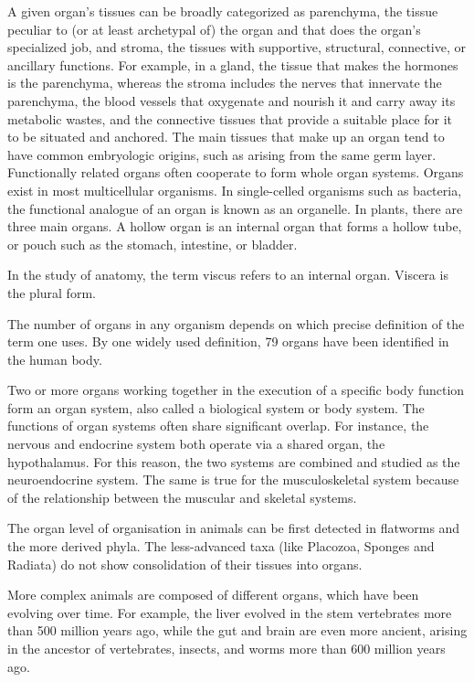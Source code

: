A given organ's tissues can be broadly categorized as parenchyma, the tissue peculiar to (or at least archetypal of) the organ and that does the organ's specialized job, and stroma, the tissues with supportive, structural, connective, or ancillary functions. For example, in a gland, the tissue that makes the hormones is the parenchyma, whereas the stroma includes the nerves that innervate the parenchyma, the blood vessels that oxygenate and nourish it and carry away its metabolic wastes, and the connective tissues that provide a suitable place for it to be situated and anchored. The main tissues that make up an organ tend to have common embryologic origins, such as arising from the same germ layer. Functionally related organs often cooperate to form whole organ systems. Organs exist in most multicellular organisms. In single-celled organisms such as bacteria, the functional analogue of an organ is known as an organelle. In plants, there are three main organs. A hollow organ is an internal organ that forms a hollow tube, or pouch such as the stomach, intestine, or bladder.

In the study of anatomy, the term viscus refers to an internal organ. Viscera is the plural form.

The number of organs in any organism depends on which precise definition of the term one uses. By one widely used definition, 79 organs have been identified in the human body.

Two or more organs working together in the execution of a specific body function form an organ system, also called a biological system or body system. The functions of organ systems often share significant overlap. For instance, the nervous and endocrine system both operate via a shared organ, the hypothalamus. For this reason, the two systems are combined and studied as the neuroendocrine system. The same is true for the musculoskeletal system because of the relationship between the muscular and skeletal systems.

The organ level of organisation in animals can be first detected in flatworms and the more derived phyla. The less-advanced taxa (like Placozoa, Sponges and Radiata) do not show consolidation of their tissues into organs.

More complex animals are composed of different organs, which have been evolving over time. For example, the liver evolved in the stem vertebrates more than 500 million years ago, while the gut and brain are even more ancient, arising in the ancestor of vertebrates, insects, and worms more than 600 million years ago.




